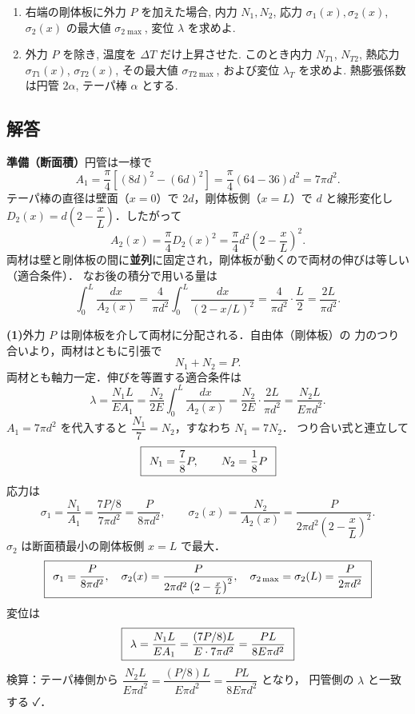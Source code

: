 \documentclass[11pt,a4paper]{article}
\begin{document}
\begin{enumerate}[label=(\arabic*)]
  \item 右端の剛体板に外力 $P$ を加えた場合, 内力 $N_1,N_2$, 応力 $\sigma_1(x),\sigma_2(x)$,
        $\sigma_2(x)$ の最大値 $\sigma_{2\max}$, 変位 $\lambda$ を求めよ.
  \item 外力 $P$ を除き, 温度を $\Delta T$ だけ上昇させた.
        このとき内力 $N_{T1}$, $N_{T2}$, 熱応力 $\sigma_{T1}(x)$, $\sigma_{T2}(x)$,
        その最大値 $\sigma_{T2\max}$, および変位 $\lambda_T$ を求めよ.
        熱膨張係数は円管 $2\alpha$, テーパ棒 $\alpha$ とする.
\end{enumerate}

\subsection*{解答}

\noindent\textbf{準備（断面積）}\quad 円管は一様で
\[
  A_1=\frac{\pi}{4}\!\left[(8d)^2-(6d)^2\right]=\frac{\pi}{4}(64-36)d^2=7\pi d^2 .
\]
テーパ棒の直径は壁面（$x=0$）で $2d$，剛体板側（$x=L$）で $d$ と線形変化し
$D_2(x)=d\!\left(2-\dfrac{x}{L}\right)$．したがって
\[
  A_2(x)=\frac{\pi}{4}D_2(x)^2=\frac{\pi}{4}d^2\!\left(2-\frac{x}{L}\right)^{\!2}.
\]
両材は壁と剛体板の間に\textbf{並列}に固定され，剛体板が動くので両材の伸びは等しい（適合条件）．
なお後の積分で用いる量は
\[
  \int_0^L \frac{dx}{A_2(x)}=\frac{4}{\pi d^2}\int_0^L\frac{dx}{(2-x/L)^2}
  =\frac{4}{\pi d^2}\cdot\frac{L}{2}=\frac{2L}{\pi d^2}.
\]

\medskip
\noindent\textbf{(1)}\quad 外力 $P$ は剛体板を介して両材に分配される．自由体（剛体板）の
力のつり合いより，両材はともに引張で
\[
  N_1 + N_2 = P. \tag{つり合い}
\]
両材とも軸力一定．伸びを等置する適合条件は
\[
  \lambda=\frac{N_1 L}{E A_1}
  =\frac{N_2}{2E}\int_0^L\frac{dx}{A_2(x)}
  =\frac{N_2}{2E}\cdot\frac{2L}{\pi d^2}=\frac{N_2 L}{E\pi d^2}.
\]
$A_1=7\pi d^2$ を代入すると $\dfrac{N_1}{7}=N_2$，すなわち $N_1=7N_2$．
つり合い式と連立して
\[
  \boxed{\,\;N_1=\frac{7}{8}P,\qquad N_2=\frac{1}{8}P\;\,}
\]
応力は
\[
  \sigma_1=\frac{N_1}{A_1}=\frac{7P/8}{7\pi d^2}=\frac{P}{8\pi d^2},\qquad
  \sigma_2(x)=\frac{N_2}{A_2(x)}=\frac{P}{2\pi d^2\left(2-\dfrac{x}{L}\right)^{2}}.
\]
$\sigma_2$ は断面積最小の剛体板側 $x=L$ で最大．
\[
  \boxed{\,\;\sigma_1=\frac{P}{8\pi d^2},\quad
  \sigma_2(x)=\frac{P}{2\pi d^2\left(2-\frac{x}{L}\right)^{2}},\quad
  \sigma_{2\max}=\sigma_2(L)=\frac{P}{2\pi d^2}\;\,}
\]
変位は
\[
  \boxed{\,\;\lambda=\frac{N_1 L}{EA_1}=\frac{(7P/8)L}{E\cdot 7\pi d^2}=\frac{PL}{8E\pi d^2}\;\,}
\]
検算：テーパ棒側から $\dfrac{N_2 L}{E\pi d^2}=\dfrac{(P/8)L}{E\pi d^2}=\dfrac{PL}{8E\pi d^2}$ となり，
円管側の $\lambda$ と一致する ✓．
\end{document}

